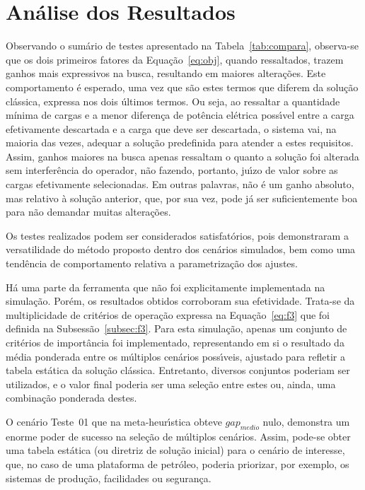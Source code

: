 \section{An{\'a}lise dos Resultados} \label{sec:anares}

Observando o sum{\'a}rio de testes apresentado na Tabela~\ref{tab:compara}, observa-se que os dois primeiros fatores da Equa{\c c}{\~a}o~\ref{eq:obj}, quando ressaltados, trazem ganhos mais expressivos na busca, resultando em maiores altera{\c c}{\~o}es. Este comportamento {\'e} esperado, uma vez que s{\~a}o estes termos que diferem da solu{\c c}{\~a}o cl{\'a}ssica, expressa nos dois {\'u}ltimos termos. Ou seja, ao ressaltar a quantidade m{\'i}nima de cargas e a menor diferen{\c c}a de pot{\^e}ncia el{\'e}trica poss{\'\i}vel entre a carga efetivamente descartada e a carga que deve ser descartada, o sistema vai, na maioria das vezes, adequar a solu{\c c}{\~a}o predefinida para atender a estes requisitos. Assim, ganhos maiores na busca apenas ressaltam o quanto a solu{\c c}{\~a}o foi alterada sem interfer{\^e}ncia do operador, n{\~a}o fazendo, portanto, ju{\'\i}zo de valor sobre as cargas efetivamente selecionadas. Em outras palavras, n{\~a}o {\'e} um ganho absoluto, mas relativo {\`a} solu{\c c}{\~a}o anterior, que, por sua vez, pode j{\'a} ser suficientemente boa para n{\~a}o demandar muitas altera{\c c}{\~o}es.

Os testes realizados podem ser considerados satisfat{\'o}rios, pois demonstraram a versatilidade do m{\'e}todo proposto dentro dos cen{\'a}rios simulados, bem como uma tend{\^e}ncia de comportamento relativa a parametriza{\c c}{\~a}o dos ajustes.

H{\'a} uma parte da ferramenta que n{\~a}o foi explicitamente implementada na simula{\c c}{\~a}o. Por{\'e}m, os resultados obtidos corroboram sua efetividade. Trata-se da multiplicidade de crit{\'e}rios de opera{\c c}{\~a}o expressa na Equa{\c c}{\~a}o~\ref{eq:f3} que foi definida na Subsess{\~a}o~\ref{subsec:f3}. Para esta simula{\c c}{\~a}o, apenas um conjunto de crit{\'e}rios de import{\^a}ncia foi implementado, representando em si o resultado da m{\'e}dia ponderada entre os m{\'u}ltiplos cen{\'a}rios poss{\'\i}veis, ajustado para refletir a tabela est{\'a}tica da solu{\c c}{\~a}o cl{\'a}ssica. Entretanto, diversos conjuntos poderiam ser utilizados, e o valor final poderia ser uma sele{\c c}{\~a}o entre estes ou, ainda, uma combina{\c c}{\~a}o ponderada destes. 

O cen{\'a}rio Teste~01 que na meta-heur{\'\i}stica obteve $gap_{medio}$ nulo, demonstra um enorme poder de sucesso na sele{\c c}{\~a}o de m{\'u}ltiplos cen{\'a}rios. Assim, pode-se obter uma tabela est{\'a}tica (ou diretriz de solu{\c c}{\~a}o inicial) para o cen{\'a}rio de interesse, que, no caso de uma plataforma de petr{\'o}leo, poderia priorizar, por exemplo, os sistemas de produ{\c c}{\~a}o, facilidades ou seguran{\c c}a.

